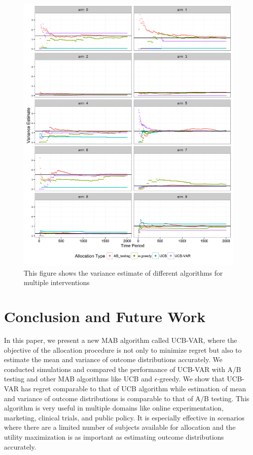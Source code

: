 \documentclass[12pt, letterpaper]{article}
\begin{document}
\begin{figure}[]
  \centering
    \includegraphics[width=\textwidth]{figs/var.png}
      \caption{This figure shows the variance estimate of different algorithms for multiple interventions}
      \label{var}
\end{figure}




\section*{Conclusion and Future Work}

In this paper, we present a new MAB algorithm called UCB-VAR, where the objective of the allocation procedure is not only to minimize regret but also to estimate the mean and variance of outcome distributions accurately. We conducted simulations and compared the performance of UCB-VAR with A/B testing and other MAB algorithms like UCB and $\epsilon$-greedy. We show that UCB-VAR has regret comparable to that of UCB algorithm while estimation of mean and variance of outcome distributions is comparable to that of A/B testing. This algorithm is very useful in multiple domains like online experimentation, marketing, clinical trials, and public policy. It is especially effective in scenarios where there are a limited number of subjects available for allocation and the utility maximization is as important as estimating outcome distributions accurately. 
\end{document}
